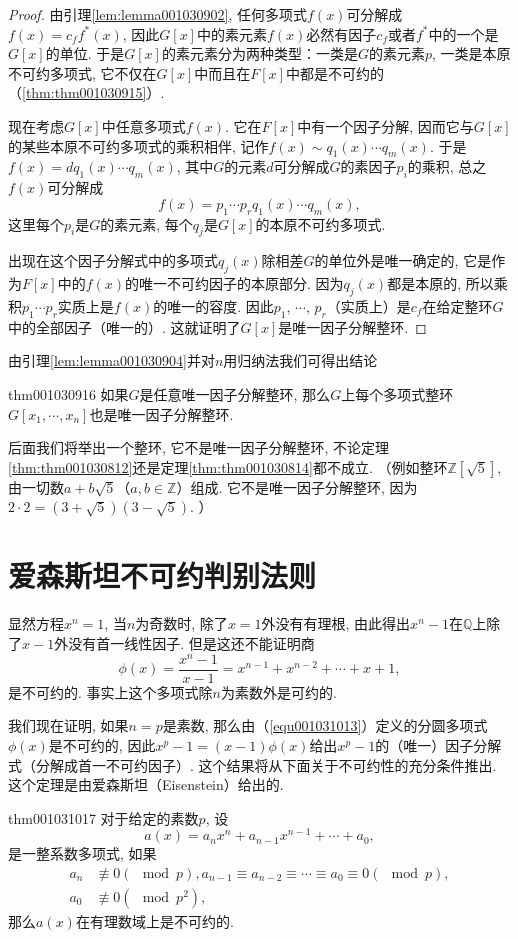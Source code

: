 \begin{proof}
由引理\ref{lem:lemma001030902}, 任何多项式$f(x)$可分解成$f(x)=c_ff^*(x)$, 因此$G[x]$中的素元素$f(x)$必然有因子$c_f$或者$f^*$中的一个是$G[x]$的单位. 于是$G[x]$的素元素分为两种类型：一类是$G$的素元素$p$, 一类是本原不可约多项式, 它不仅在$G[x]$中而且在$F[x]$中都是不可约的（\ref{thm:thm001030915}）. 

现在考虑$G[x]$中任意多项式$f(x)$. 它在$F[x]$中有一个因子分解, 因而它与$G[x]$的某些本原不可约多项式的乘积相伴, 记作$f(x)\sim q_1(x)\cdots q_m(x)$. 于是$f(x)=dq_1(x)\cdots q_m(x)$, 其中$G$的元素$d$可分解成$G$的素因子$p_i$的乘积, 总之$f(x)$可分解成
\[
f(x)=p_1 \cdots p_rq_1(x)\cdots q_m(x),
\]
这里每个$p_i$是$G$的素元素, 每个$q_j$是$G[x]$的本原不可约多项式. 

出现在这个因子分解式中的多项式$q_j(x)$除相差$G$的单位外是唯一确定的, 它是作为$F[x]$中的$f(x)$的唯一不可约因子的本原部分. 因为$q_j(x)$都是本原的, 所以乘积$p_1 \cdots p_r$实质上是$f(x)$的唯一的容度. 因此$p_1$, $\cdots$, $p_r$（实质上）是$c_f$在给定整环$G$中的全部因子（唯一的）. 这就证明了$G[x]$是唯一因子分解整环. 
\end{proof}

由引理\ref{lem:lemma001030904}并对$n$用归纳法我们可得出结论
\begin{theorem}{}{thm001030916}
如果$G$是任意唯一因子分解整环, 那么$G$上每个多项式整环$G[x_1, \cdots, x_n]$也是唯一因子分解整环. 
\end{theorem}

后面我们将举出一个整环, 它不是唯一因子分解整环, 不论定理\ref{thm:thm001030812}还是定理\ref{thm:thm001030814}都不成立. （例如整环$\mathbb{Z}[\sqrt{5}]$, 由一切数$a+b\sqrt{5}$（$a,b \in \mathbb{Z}$）组成. 它不是唯一因子分解整环, 因为$2 \cdot 2 = (3+\sqrt{5})(3-\sqrt{5})$. ）



\section{爱森斯坦不可约判别法则}\label{subsection0010310}
显然方程$x^n=1$, 当$n$为奇数时, 除了$x=1$外没有有理根, 由此得出$x^n-1$在$\mathbb{Q}$上除了$x-1$外没有首一线性因子. 但是这还不能证明商
\begin{equation}\label{equ001031013}
\phi(x)=\frac{x^n-1}{x-1}=x^{n-1}+x^{n-2}+\cdots +x+1,
\end{equation}
是不可约的. 事实上这个多项式除$n$为素数外是可约的. 

我们现在证明, 如果$n=p$是素数, 那么由（\ref{equ001031013}）定义的分圆多项式$\phi(x)$是不可约的, 因此$x^p-1=(x-1)\phi(x)$给出$x^p-1$的（唯一）因子分解式（分解成首一不可约因子）. 这个结果将从下面关于不可约性的充分条件推出. 这个定理是由爱森斯坦（Eisenstein）给出的. 
\begin{theorem}{}{thm001031017}
对于给定的素数$p$, 设
\[
a(x)=a_nx^n+a_{n-1}x^{n-1}+\cdots+a_0,
\]
是一整系数多项式, 如果
\[
\begin{aligned}
a_n &\not\equiv 0(\mod{p}),a_{n-1}\equiv a_{n-2}\equiv \cdots \equiv a_0 \equiv 0(\mod{p}),\\
a_0 &\not\equiv 0(\mod{p^2}),
\end{aligned}
\]
那么$a(x)$在有理数域上是不可约的. 
\end{theorem}

